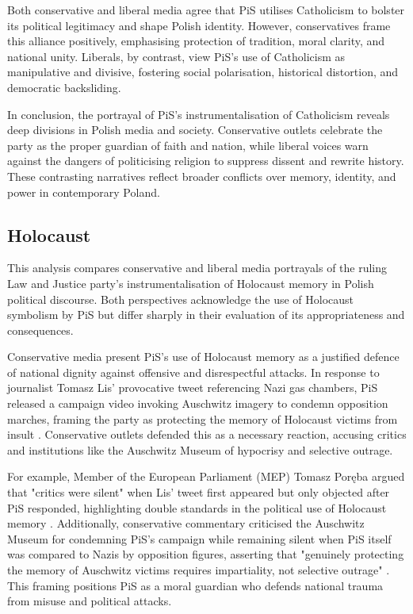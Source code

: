 Both conservative and liberal media agree that PiS utilises Catholicism to bolster its political legitimacy and shape Polish identity. However, conservatives frame this alliance positively, emphasising protection of tradition, moral clarity, and national unity. Liberals, by contrast, view PiS's use of Catholicism as manipulative and divisive, fostering social polarisation, historical distortion, and democratic backsliding.

\pagebreak

In conclusion, the portrayal of PiS's instrumentalisation of Catholicism reveals deep divisions in Polish media and society. Conservative outlets celebrate the party as the proper guardian of faith and nation, while liberal voices warn against the dangers of politicising religion to suppress dissent and rewrite history. These contrasting narratives reflect broader conflicts over memory, identity, and power in contemporary Poland.

\subsection{Holocaust}

This analysis compares conservative and liberal media portrayals of the ruling Law and Justice party's instrumentalisation of Holocaust memory in Polish political discourse. Both perspectives acknowledge the use of Holocaust symbolism by PiS but differ sharply in their evaluation of its appropriateness and consequences.

Conservative media present PiS's use of Holocaust memory as a justified defence of national dignity against offensive and disrespectful attacks. In response to journalist Tomasz Lis' provocative tweet referencing Nazi gas chambers, PiS released a campaign video invoking Auschwitz imagery to condemn opposition marches, framing the party as protecting the memory of Holocaust victims from insult \citep{wpolityce_pis_2023}. Conservative outlets defended this as a necessary reaction, accusing critics and institutions like the Auschwitz Museum of hypocrisy and selective outrage.

For example, Member of the European Parliament (MEP) Tomasz Poręba argued that "critics were silent" when Lis' tweet first appeared but only objected after PiS responded, highlighting double standards in the political use of Holocaust memory \citep{wpolityce_pis_2023}. Additionally, conservative commentary criticised the Auschwitz Museum for condemning PiS's campaign while remaining silent when PiS itself was compared to Nazis by opposition figures, asserting that "genuinely protecting the memory of Auschwitz victims requires impartiality, not selective outrage" \citep{wpolityce_gdy_2023}. This framing positions PiS as a moral guardian who defends national trauma from misuse and political attacks.

